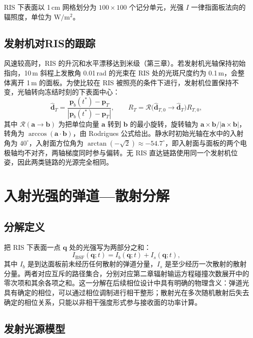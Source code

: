 RIS 下表面以 1\,cm 网格划分为 $100\times100$ 个记分单元，光强 $I$ 一律指面板法向的辐照度，单位为 $\mathrm{W/m^2}$。

\subsection{发射机对RIS的跟踪}

风速较高时，RIS 的升沉和水平漂移达到米级（第三章）。若发射机光轴保持初始指向，10\,m 斜程上发散角 0.01\,rad 的光束在 RIS 处的光斑尺度约为 0.1\,m，会整体离开 1\,m 的面板。为使比较在 RIS 被照亮的条件下进行，发射机位置保持不变，光轴转向冻结时刻的下表面中心：
\begin{equation}
\hat{\mathbf d}_T=\frac{\mathbf p_b(t^\ast)-\mathbf p_T}{|\mathbf p_b(t^\ast)-\mathbf p_T|},\qquad
R_T=\mathcal R\big(\hat{\mathbf d}_{T,0}\to\hat{\mathbf d}_T\big)R_{T,0},
\label{eq:c4_track}
\end{equation}
其中 $\mathcal R(\mathbf a\to\mathbf b)$ 为把单位向量 $\mathbf a$ 转到 $\mathbf b$ 的最小旋转，旋转轴为 $\mathbf a\times\mathbf b/|\mathbf a\times\mathbf b|$，转角为 $\arccos(\mathbf a\cdot\mathbf b)$，由 Rodrigues 公式给出。静水时初始光轴在水中的入射角为 $40^\circ$，入射面方位角为 $\arctan(-\sqrt2)\approx-54.7^\circ$，即入射面与面板的两个电极轴均不对齐，两轴梯度同时参与偏转。无 RIS 直达链路使用同一个发射机位姿，因此两类链路的光源完全相同。

\section{入射光强的弹道—散射分解}
\label{sec:c4_decomp}

\subsection{分解定义}

把 RIS 下表面一点 $\mathbf q$ 处的光强写为两部分之和：
\begin{equation}
I_{\mathrm{BSF}}(\mathbf q;t)=I_b(\mathbf q;t)+I_s(\mathbf q;t),
\label{eq:c4_decomp}
\end{equation}
其中 $I_b$ 是到达面板前未经历任何散射的弹道分量，$I_s$ 是至少经历一次散射的散射分量。两者对应互斥的路径集合，分别对应第二章辐射输运方程碰撞次数展开中的零次项和其余各项之和。这一分解在后续相位设计中具有明确的物理含义：弹道光具有确定的相位，可以通过相位调制进行相干整形；散射光在多次随机散射后失去确定的相位关系，只能以非相干强度形式参与接收面的功率计算。

\subsection{发射光源模型}


